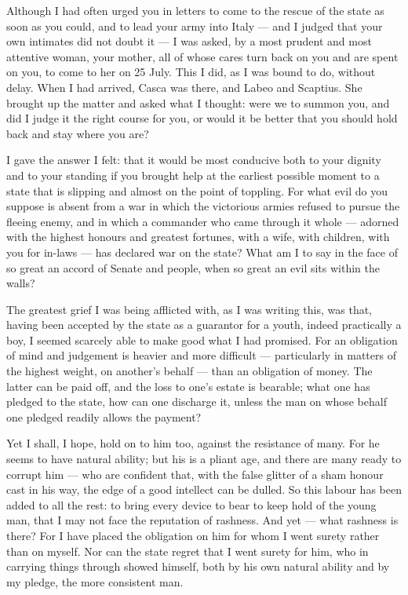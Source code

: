 

 Although I had often urged you in letters to come to the rescue of the state as soon as you could, and to lead your army into Italy --- and I judged that your own intimates did not doubt it --- I was asked, by a most prudent and most attentive woman, your mother, all of whose cares turn back on you and are spent on you, to come to her on 25 July. This I did, as I was bound to do, without delay. When I had arrived, Casca was there, and Labeo and Scaptius. She brought up the matter and asked what I thought: were we to summon you, and did I judge it the right course for you, or would it be better that you should hold back and stay where you are?

 I gave the answer I felt: that it would be most conducive both to your dignity and to your standing if you brought help at the earliest possible moment to a state that is slipping and almost on the point of toppling. For what evil do you suppose is absent from a war in which the victorious armies refused to pursue the fleeing enemy, and in which a commander who came through it whole --- adorned with the highest honours and greatest fortunes, with a wife, with children, with you for in-laws --- has declared war on the state? What am I to say in the face of so great an accord of Senate and people, when so great an evil sits within the walls?

 The greatest grief I was being afflicted with, as I was writing this, was that, having been accepted by the state as a guarantor for a youth, indeed practically a boy, I seemed scarcely able to make good what I had promised. For an obligation of mind and judgement is heavier and more difficult --- particularly in matters of the highest weight, on another's behalf --- than an obligation of money. The latter can be paid off, and the loss to one's estate is bearable; what one has pledged to the state, how can one discharge it, unless the man on whose behalf one pledged readily allows the payment?

 Yet I shall, I hope, hold on to him too, against the resistance of many. For he seems to have natural ability; but his is a pliant age, and there are many ready to corrupt him --- who are confident that, with the false glitter of a sham honour cast in his way, the edge of a good intellect can be dulled. So this labour has been added to all the rest: to bring every device to bear to keep hold of the young man, that I may not face the reputation of rashness. And yet --- what rashness is there? For I have placed the obligation on him for whom I went surety rather than on myself. Nor can the state regret that I went surety for him, who in carrying things through showed himself, both by his own natural ability and by my pledge, the more consistent man.

